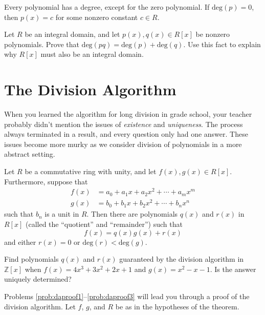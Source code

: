 Every polynomial has a degree, except for the zero polynomial. If \(\mbox{deg}(p)=0\), then \(p(x)=c\) for some nonzero constant \(c\in R\).

\begin{problem}
Let \(R\) be an integral domain, and let \(p(x),q(x) \in R[x]\) be nonzero polynomials. Prove that \(\mbox{deg}(pq) = \mbox{deg}(p)+\mbox{deg}(q)\). Use this fact to explain why \(R[x]\) must also be an integral domain.
\end{problem}

\section{The Division Algorithm}
When you learned the algorithm for long division in grade school, your teacher probably didn't mention the issues of \emph{existence} and \emph{uniqueness}. The process always terminated in a result, and every question only had one answer. These issues become more murky as we consider division of polynomials in a more abstract setting.

\begin{theorem}
Let \(R\) be a commutative ring with unity, and let \(f(x),g(x)\in R[x]\). Furthermore, suppose that
\begin{align*}
f(x) &= a_0 + a_1x +a_2x^2 + \cdots + a_m x^m \\
g(x) &= b_0 + b_1x +b_2x^2 + \cdots + b_n x^n
\end{align*}
such that $b_n$ is a unit in \(R\). Then there are polynomials \(q(x)\) and \(r(x)\) in \(R[x]\) (called the ``quotient'' and ``remainder'') such that
\[ f(x) = q(x)g(x) + r(x) \]
and either \(r(x) = 0\) or \(\mbox{deg}(r) < \mbox{deg}(g) \).
\end{theorem}

\begin{problem}
Find polynomials \(q(x)\) and \(r(x)\) guaranteed by the division algorithm in \(\mathbb{Z}[x]\) when \(f(x) = 4x^3 + 3x^2 + 2x + 1\) and \(g(x)=x^2 - x - 1 \). Is the answer uniquely determined?
\end{problem}

Problems \ref{prob:daproof1}--\ref{prob:daproof3} will lead you through a proof of the division algorithm. Let \(f\), \(g\), and \(R\) be as in the hypotheses of the theorem.
\begin{annotation}
\end{annotation}


